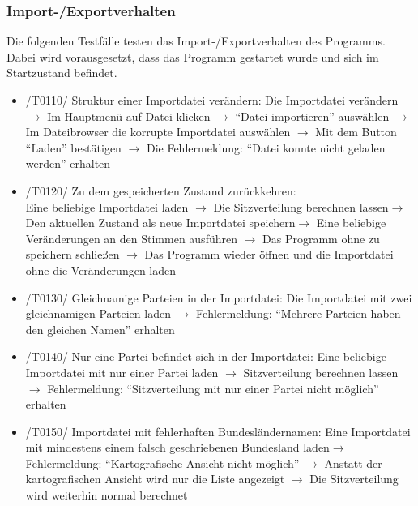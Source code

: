 \documentclass[10pt,a4paper]{article}
\begin{document}
\subsubsection{Import-/Exportverhalten}
Die folgenden Testfälle testen das Import-/Exportverhalten des Programms. Dabei wird vorausgesetzt, dass das Programm gestartet wurde und sich im Startzustand befindet. 
\begin{itemize}
	\item /T0110/ Struktur einer Importdatei verändern: \newline
	Die Importdatei verändern$\rightarrow$ Im Hauptmenü auf Datei klicken $\rightarrow$ ``Datei importieren'' auswählen $\rightarrow$ Im Dateibrowser die korrupte Importdatei auswählen $\rightarrow$ Mit dem Button ``Laden'' bestätigen $\rightarrow$ Die Fehlermeldung: ``Datei konnte nicht geladen werden'' erhalten
	\item /T0120/ Zu dem gespeicherten Zustand zurückkehren: \\
	Eine beliebige Importdatei laden $\rightarrow$ Die Sitzverteilung berechnen lassen$\rightarrow$ Den aktuellen Zustand als neue Importdatei speichern$\rightarrow$ Eine beliebige Veränderungen an den Stimmen ausführen $\rightarrow$ Das Programm ohne zu speichern schließen $\rightarrow$ Das Programm wieder öffnen und die Importdatei ohne die Veränderungen laden
	\item /T0130/ Gleichnamige Parteien in der Importdatei: \newline
	Die Importdatei mit zwei gleichnamigen Parteien laden $\rightarrow$ Fehlermeldung: ``Mehrere Parteien haben den gleichen Namen'' erhalten
	\item /T0140/ Nur eine Partei befindet sich in der Importdatei: \newline
	Eine beliebige Importdatei mit nur einer Partei laden $\rightarrow$ Sitzverteilung berechnen lassen $\rightarrow$ Fehlermeldung: ``Sitzverteilung mit nur einer Partei nicht möglich'' erhalten
	\item /T0150/ Importdatei mit fehlerhaften Bundesländernamen: \newline
	Eine Importdatei mit mindestens einem falsch geschriebenen Bundesland laden$\rightarrow$ Fehlermeldung: ``Kartografische Ansicht nicht möglich'' $\rightarrow$ Anstatt der kartografischen Ansicht wird nur die Liste angezeigt $\rightarrow$ Die Sitzverteilung wird weiterhin normal berechnet\newline
\end{itemize}
\end{document}
